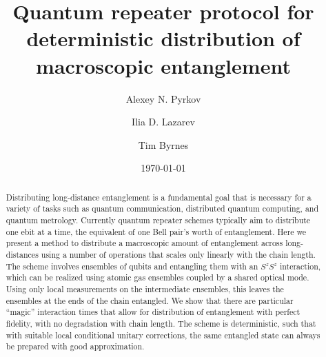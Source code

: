 \documentclass[%
  prx,%
  twocolumn,%
  preprintnumbers,%
  amsmath,%
  amssymb,%
  superscriptaddress%
]{revtex4}
\begin{document}

\title{Quantum repeater protocol for deterministic distribution of macroscopic entanglement}

\author{Alexey N. Pyrkov}


\author{Ilia D. Lazarev}

\author{Tim Byrnes}


\date{\today}%


\begin{abstract}
Distributing long-distance entanglement is a fundamental goal that is necessary for a variety of tasks such as quantum communication, distributed quantum computing, and quantum metrology.  Currently quantum repeater schemes typically  aim to distribute one ebit at a time, the equivalent of one Bell pair's worth of entanglement.  Here we present a method to distribute a macroscopic amount of entanglement across long-distances using a number of operations that scales only linearly with the chain length.  The scheme involves ensembles of qubits and entangling them with an $S^z S^z$ interaction, which can be realized using atomic gas ensembles coupled by a shared optical mode. Using only local measurements on the intermediate ensembles, this leaves the ensembles at the ends of the chain entangled.  We show that there are particular ``magic'' interaction times that allow for distribution of entanglement with perfect fidelity, with no degradation with chain length.  The scheme is deterministic, such that with suitable local conditional unitary corrections, the same entangled state can always be prepared with good approximation.  
\end{abstract}
\end{document}
